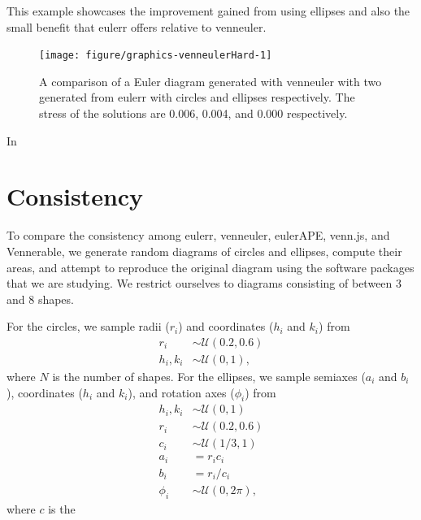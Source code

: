 \documentclass[
  oneside,
  openany,
  numbers=noendperiod,
  parskip=half,
  bibliography=totoc
]{scrbook}\usepackage[]{graphicx}\usepackage{xcolor}
\newenvironment{knitrout}{}{} %
\newcommand{\pkg}[1]{{\fontseries{b}\selectfont #1}}
\begin{document}
This example showcases the improvement gained from using ellipses and also the
small benefit that \pkg{eulerr} offers relative to \pkg{venneuler}.

\begin{figure}[thbp]
\begin{knitrout}\small
{}\color{fgcolor}

{\centering \texttt{[image: figure/graphics-venneulerHard-1]} 

}



\end{knitrout}
\caption{A comparison of a Euler diagram generated with \pkg{venneuler} with two
generated from \pkg{eulerr} with circles and ellipses respectively. The stress
of the solutions are 0.006, 0.004, and 0.000 respectively.}
\label{fig:venneulerHard}
\end{figure}

In

\section{Consistency}
\label{sec:consistency}

To compare the consistency among \pkg{eulerr}, \pkg{venneuler}, \pkg{eulerAPE},
\pkg{venn.js}, and \pkg{Vennerable}, we generate random diagrams of circles and
ellipses, compute their areas, and attempt to reproduce the original diagram
using the software packages that we are studying. We restrict ourselves to
diagrams consisting of between 3 and 8 shapes.

For the circles, we sample radii ($r_i$) and coordinates ($h_i$ and $k_i$) from
%
\begin{equation}
\begin{aligned}
r_i     & \sim \mathcal{U}(0.2, 0.6)\\
h_i,k_i & \sim \mathcal{U}(0, 1),
\end{aligned}
\label{eq:consistencyCircles}
\end{equation}
where $N$ is the number of shapes.
For the ellipses, we sample semiaxes ($a_i$ and $b_i$), coordinates
($h_i$ and $k_i$), and rotation axes ($\phi_i$) from
%
\begin{equation}
\begin{aligned}
h_i,k_i & \sim \mathcal{U}(0, 1)\\
r_i     & \sim \mathcal{U}(0.2, 0.6)\\
c_i     & \sim \mathcal{U}(1/3, 1)\\
a_i     & = r_ic_i\\
b_i     & = r_i/c_i\\
\phi_i  & \sim \mathcal{U}(0, 2\pi),
\end{aligned}
\label{eq:consistencyEllipses}
\end{equation}
where $c$ is the
\end{document}
